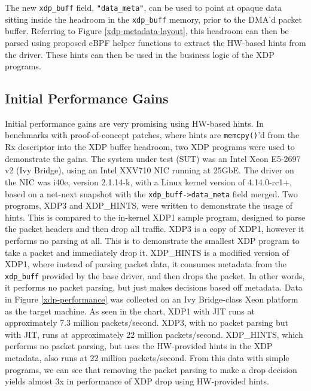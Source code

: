\documentclass[letterpaper]{article}
\begin{document}
The new {\small \texttt{xdp\_buff}} field, {\small \texttt{"data\_meta"}}, can be used to point at opaque data sitting inside the headroom in the {\small \texttt{xdp\_buff}} memory, prior to the DMA'd packet buffer. Referring to Figure \ref{xdp-metadata-layout}, this headroom can then be parsed using proposed eBPF helper functions to extract the HW-based hints from the driver. These hints can then be used in the business logic of the XDP programs.

\subsection{Initial Performance Gains}

Initial performance gains are very promising using HW-based hints. In benchmarks with proof-of-concept patches, where hints are {\small \texttt{memcpy()}}'d from the Rx descriptor into the XDP buffer headroom, two XDP programs were used to demonstrate the gains.
\newline
\indent The system under test (SUT) was an Intel Xeon E5-2697 v2 (Ivy Bridge), using an Intel XXV710 NIC running at 25GbE. The driver on the NIC was i40e, version 2.1.14-k, with a Linux kernel version of 4.14.0-rc1+, based on a net-next snapshot with the {\small \texttt{xdp\_buff->data\_meta}} field merged.
\newline
\indent Two programs, XDP3 and XDP\_HINTS, were written to demonstrate the usage of hints. This is compared to the in-kernel XDP1 sample program, designed to parse the packet headers and then drop all traffic.  XDP3 is a copy of XDP1, however it performs no parsing at all. This is to demonstrate the smallest XDP program to take a packet and immediately drop it.  XDP\_HINTS is a modified version of XDP1, where instead of parsing packet data, it consumes metadata from the {\small \texttt{xdp\_buff}} provided by the base driver, and then drops the packet. In other words, it performs no packet parsing, but just makes decisions based off metadata.
\newline
\indent Data in Figure \ref {xdp-performance} was collected on an Ivy Bridge-class Xeon platform as the target machine. As seen in the chart, XDP1 with JIT runs at approximately 7.3 million packets/second. XDP3, with no packet parsing but with JIT, runs at approximately 22 million packets/second. XDP\_HINTS, which performs no packet parsing, but uses the HW-provided hints in the XDP metadata, also runs at 22 million packets/second. From this data with simple programs, we can see that removing the packet parsing to make a drop decision yields almost 3x in performance of XDP drop using HW-provided hints.
\end{document}
